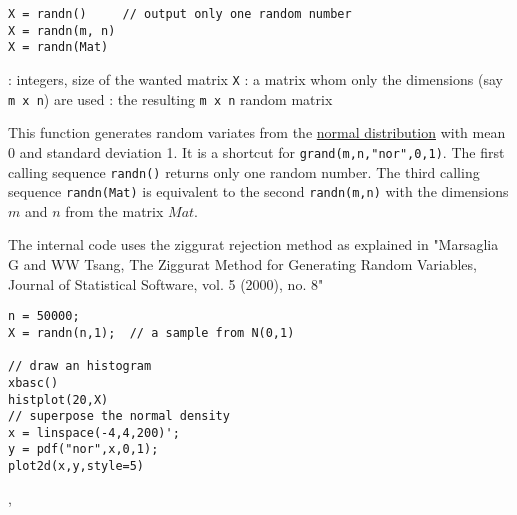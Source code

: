 \begin{mandesc}
\end{mandesc}
\begin{calling_sequence}
\begin{verbatim}
X = randn()     // output only one random number 
X = randn(m, n)
X = randn(Mat)
\end{verbatim}
\end{calling_sequence}
\begin{parameters}
  \begin{varlist}
    : integers, size of the wanted matrix \verb!X!
   : a matrix whom only the dimensions (say \verb!m x n!) are used
   : the resulting \verb!m x n! random matrix
  \end{varlist}
  \end{parameters}
  
\begin{mandescription}
  This function generates random variates from the  \hyperlink{norpdf}{normal distribution} with
 mean 0 and standard deviation 1. It is a shortcut for \verb+grand(m,n,"nor",0,1)+.
  The first calling sequence \verb+randn()+ returns only one random number. The
 third calling sequence \verb+randn(Mat)+ is equivalent to the second  
 \verb+randn(m,n)+ with the dimensions $m$ and $n$ from the matrix $Mat$.

  The internal code uses the ziggurat rejection method as explained in "Marsaglia 
G and WW Tsang, The Ziggurat Method for Generating Random Variables, Journal of Statistical 
 Software, vol. 5 (2000), no. 8"
 
\end{mandescription}

\begin{examples}
\begin{Verbatim}
n = 50000;
X = randn(n,1);  // a sample from N(0,1)

// draw an histogram
xbasc()
histplot(20,X)
// superpose the normal density
x = linspace(-4,4,200)';
y = pdf("nor",x,0,1);
plot2d(x,y,style=5)
\end{Verbatim}
\end{examples}

\begin{manseealso}
  ,    
\end{manseealso}



